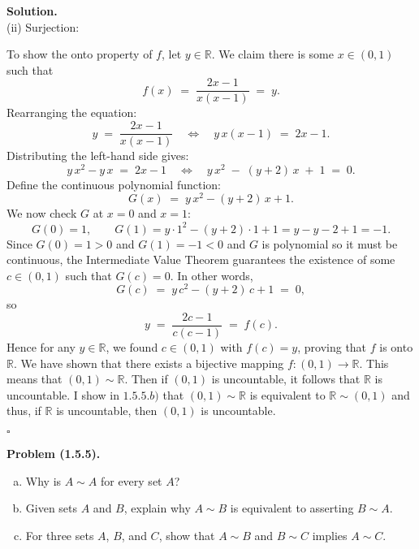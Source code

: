 \documentclass[12pt]{article}
\theoremstyle{definition}
\theoremstyle{remark}
\newenvironment{problem}[1]{
    \vspace{1em}
    \noindent
    \textbf{Problem #1.} 
}{
    \vspace{1em}
}
\newenvironment{solution}{
    \noindent
    \textbf{Solution.}\\
}{
    \quad \hfill $\square$
    \vspace{1em}
}
\begin{document}
\begin{solution}
    (ii) Surjection:
    
    To show the onto property of $f$, let $y \in \mathbb{R}$. We claim there is some $x \in (0,1)$ such that 
\[
f(x) \;=\; \frac{2x - 1}{x(x - 1)} \;=\; y.
\]
Rearranging the equation:
\[
y \;=\; \frac{2x - 1}{x(x-1)}
\quad\Longleftrightarrow\quad
y\, x(x-1) \;=\; 2x - 1.
\]
Distributing the left-hand side gives:
\[
y\, x^2 - y\, x \;=\; 2x - 1
\quad\Longleftrightarrow\quad
y\, x^2 \;-\; (y + 2)\, x \;+\; 1 \;=\; 0.
\]
Define the continuous polynomial function:
\[
G(x) \;=\; y\, x^2 - (y + 2)\,x + 1.
\]
We now check $G$ at $x=0$ and $x=1$:
\[
G(0) = 1, 
\qquad
G(1) = y \cdot 1^2 - (y+2)\cdot 1 + 1 = y - y - 2 + 1 = -1.
\]
Since $G(0) = 1 > 0$ and $G(1) = -1 < 0$ and $G$ is polynomial so it must be continuous, the Intermediate Value Theorem guarantees 
the existence of some $c \in (0,1)$ such that $G(c) = 0$. In other words,
\[
G(c) 
\;=\; 
y\, c^2 - (y+2)\,c + 1 
\;=\; 
0,
\]
so
\[
y 
\;=\; 
\frac{2c - 1}{c(c - 1)} 
\;=\; 
f(c).
\]
Hence for any $y \in \mathbb{R}$, we found $c \in (0,1)$ with $f(c) = y$, 
proving that $f$ is onto $\mathbb{R}$. We have shown that there exists a bijective mapping $f: (0, 1)\rightarrow{\mathbb{R}}$. This means that $(0, 1) \sim \mathbb{R}$. Then if $(0, 1)$ is uncountable, it follows that $\mathbb{R}$ is uncountable. I show in $1.5.5.b)$ that $(0, 1) \sim \mathbb{R}$ is equivalent to $\mathbb{R} \sim (0, 1)$ and thus, if $\mathbb{R}$ is uncountable, then $(0, 1)$ is uncountable.
    

\end{solution}



\begin{problem}{(1.5.5)}
\begin{enumerate}[(a)]
    \item Why is $A\sim A$ for every set $A$?
    \item Given sets $A$ and $B$, explain why $A\sim B$ is equivalent to asserting $B\sim A$.
     \item For three sets $A$, $B$, and $C$, show that $A\sim B$ and $B\sim C$ implies $A\sim C$. 
    
\end{enumerate}
\end{problem}
\end{document}
